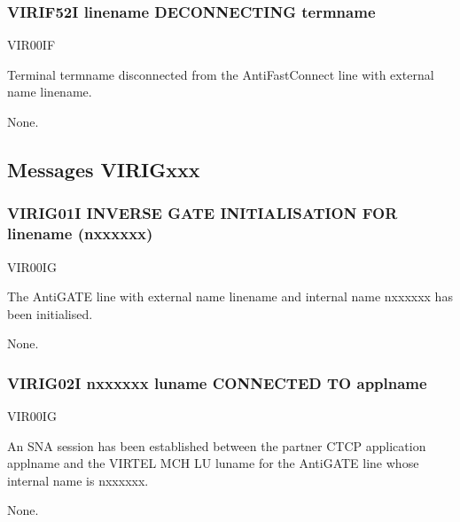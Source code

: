 \documentclass[letterpaper,10pt,english]{sphinxmanual}
\begin{document}
\subsubsection{VIRIF52I linename DECONNECTING termname}
\label{\detokenize{messages:virif52i-linename-deconnecting-termname}}\begin{description}
\sphinxAtStartPar
VIR00IF

\sphinxAtStartPar
Terminal termname disconnected from the AntiFastConnect line with external name linename.

\sphinxAtStartPar
None.

\end{description}


\subsection{Messages VIRIGxxx}
\label{\detokenize{messages:messages-virigxxx}}

\subsubsection{VIRIG01I INVERSE GATE INITIALISATION FOR linename (n\sphinxhyphen{}xxxxxx)}
\label{\detokenize{messages:virig01i-inverse-gate-initialisation-for-linename-n-xxxxxx}}\begin{description}
\sphinxAtStartPar
VIR00IG

\sphinxAtStartPar
The AntiGATE line with external name linename and internal name n\sphinxhyphen{}xxxxxx has been initialised.

\sphinxAtStartPar
None.

\end{description}


\subsubsection{VIRIG02I n\sphinxhyphen{}xxxxxx luname CONNECTED TO applname}
\label{\detokenize{messages:virig02i-n-xxxxxx-luname-connected-to-applname}}\begin{description}
\sphinxAtStartPar
VIR00IG

\sphinxAtStartPar
An SNA session has been established between the partner CTCP application applname and the VIRTEL MCH LU luname for the AntiGATE line whose internal name is n\sphinxhyphen{}xxxxxx.

\sphinxAtStartPar
None.

\end{description}
\end{document}
